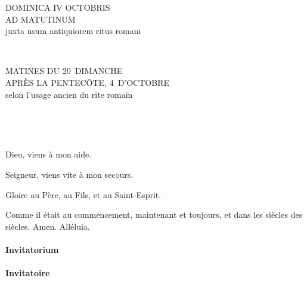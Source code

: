 \documentclass[twoside]{article}
\begin{document}
\null \newpage

\sloppy

\begin{paracol}[1]{2}

\begin{center}\begin{doublespace}

{
\MakeUppercase{\Large Dominica IV Octobris \\ ad Matutinum}\\
juxta usum antiquiorem ritus romani}
\end{doublespace}\end{center}


~~

\switchcolumn

\begin{center}\begin{doublespace}
{
\MakeUppercase{\Large Matines du 20\ieme~dimanche \\ après la Pentecôte, 4\ieme~d'octobre}\\
selon l'usage ancien du rite romain
}
\end{doublespace}\end{center}

~~

~~

\vv Dieu, viens à mon aide.

\rr Seigneur, viens vite à mon secours.

\vv Gloire au Père, au Fils, et au Saint-Esprit.

\rr Comme il était au commencement, maintenant et toujours, et dans les siècles des siècles. Amen. Alléluia.

\switchcolumn*

\paragraph{Invitatorium}


\switchcolumn

\paragraph{Invitatoire}


\end{paracol}
\end{document}
